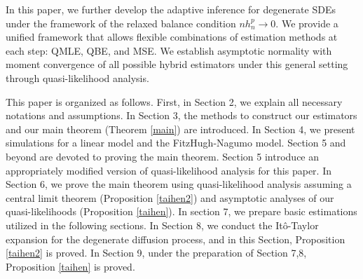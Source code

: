 \documentclass[a4paper,11pt]{jsarticle}
\begin{document}
In this paper, we further develop the adaptive inference for degenerate SDEs under the framework of the relaxed balance condition $nh_n^p \to 0$. We provide a unified framework that allows flexible combinations of estimation methods at each step: QMLE, QBE, and MSE. We establish asymptotic normality with moment convergence of all possible hybrid estimators under this general setting through quasi-likelihood analysis.

This paper is organized as follows. First, in Section 2, we explain all necessary notations and assumptions. In Section 3,  the methods to construct our estimators and our main theorem (Theorem \ref{main}) are introduced. In Section 4, we present simulations for a linear model and the FitzHugh-Nagumo model. Section 5 and beyond are devoted to proving the main theorem. Section 5 introduce an appropriately modified version of quasi-likelihood analysis for this paper. In Section 6, we prove the main theorem using quasi-likelihood analysis assuming a central limit theorem (Proposition \ref{taihen2}) and asymptotic analyses of our quasi-likelihoods (Proposition \ref{taihen}). In section 7, we prepare basic estimations utilized in the following sections. In Section 8, we conduct the Itô-Taylor expansion for the degenerate diffusion process, and in this Section, Proposition \ref{taihen2} is proved. In Section 9, under the preparation of Section 7,8, Proposition \ref{taihen} is proved.
\end{document}
